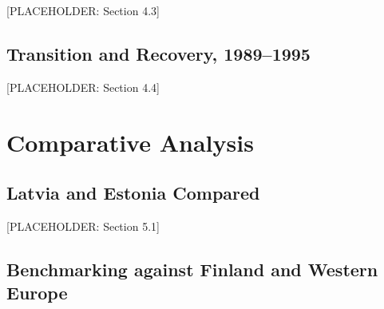 \documentclass[12pt,a4paper]{article}
\begin{document}
[PLACEHOLDER: Section 4.3]

\subsection{Transition and Recovery, 1989--1995}
\label{sec:estonia-transition}

[PLACEHOLDER: Section 4.4]

\begin{table}[H]
  \centering
  \caption{Estonia: GDP per Capita, Decennial Benchmarks}
  \label{tab:estonia-gdp}
  
\end{table}


\section{Comparative Analysis}
\label{sec:comparative}

\subsection{Latvia and Estonia Compared}
\label{sec:comparative-bilateral}

[PLACEHOLDER: Section 5.1]

\subsection{Benchmarking against Finland and Western Europe}
\label{sec:comparative-finland}
\end{document}
